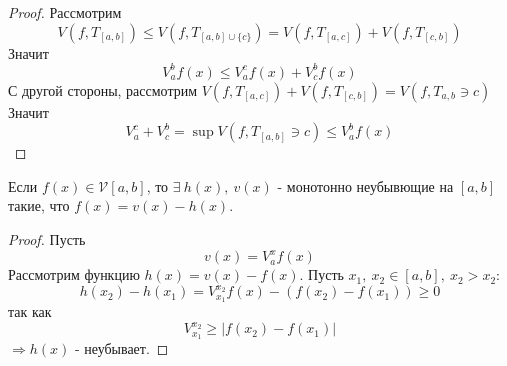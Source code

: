 \begin{proof}
    Рассмотрим 
    \[V(f,T_{[a,b]})\leq V(f, T_{[a,b]\cup \{c\}})=V(f, T_{[a,c]})+V(f,T_{[c,b]})\]
    Значит
    \[V_a^b f(x)\leq V_a^c f(x)+V_c^bf(x)\]
    С другой стороны, рассмотрим $V(f, T_{[a,c]})+V(f, T_{[c,b]})=V(f, T_{a,b}\ni c)$ Значит
    \[V_a^c+V_c^b=\sup V(f,T_{[a,b]}\ni c)\leq V_a^b f(x)\] 
\end{proof} 
\begin{theorem}
    Если $f(x)\in \mathcal{V}[a,b]$, то $\exists\ h(x),\ v(x)$ - монотонно неубывющие на $[a,b]$ такие, что $f(x)=v(x)-h(x)$.
\end{theorem} 
\begin{proof}
    Пусть
    \[v(x)=V_a^x f(x)\]
    Рассмотрим функцию $h(x)=v(x)-f(x)$. Пусть $x_1,\ x_2\in [a,b],\ x_2>x_2$:
    \[h(x_2)-h(x_1)=V_{x_1}^{x_2}f(x)-(f(x_2)-f(x_1))\geq 0\]
    так как 
    \[V_{x_1}^{x_2}\geq|f(x_2)-f(x_1)|\]
    $\Rightarrow h(x)$ - неубывает.
\end{proof} 
